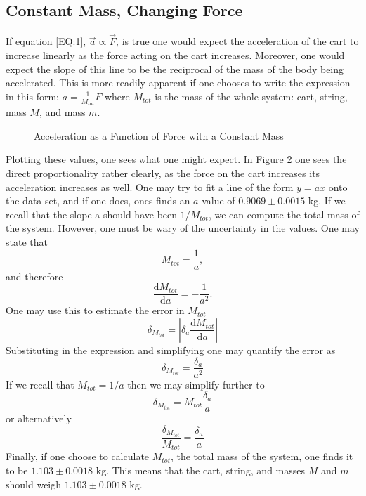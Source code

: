 \documentclass[11pt]{article}
\begin{document}
\subsection{Constant Mass, Changing Force}
If equation \eqref{EQ:1}, \( \vec{a} \propto  \vec{F} \), is true one would expect the acceleration of the cart to increase linearly as the force acting on the cart increases. Moreover, one would expect the slope of this line to be the reciprocal of the mass of the body being accelerated. This is more readily apparent if one chooses to write the expression in this form: \( a = \frac{1}{M_{tot}}F\) where \(M_{tot}\) is the mass of the whole system: cart, string, mass \(M\), and mass \(m\). 
\begin{figure}[h]
	\centering
	\caption{Acceleration as a Function of Force with a Constant Mass}
	\label{FIG:1}
\end{figure}
Plotting these values, one sees what one might expect. In Figure 2 one sees the direct proportionality rather clearly, as the force on the cart increases its acceleration increases as well. One may try to fit a line of the form \( y = ax\) onto the data set, and if one does, ones finds an \(a\) value of  \( 0.9069 \pm 0.0015\) kg. If we recall that the slope a should have been \(1 / M_{tot}\), we can compute the total mass of the system. However, one must be wary of the uncertainty in the values. One may state that 
\begin{equation}
M_{tot} = \frac{1}{a},
\end{equation}
and therefore
\begin{equation}
\frac{\mathrm{d}M_{tot}}{\mathrm{d}a} = -\frac{1}{a^2}.
\end{equation}
One may use this to estimate the error in \(M_{tot}\)
\begin{equation}
\delta_{M_{tot}} = \left| \delta_a \frac{\mathrm{d}M_{tot}}{\mathrm{d}a} \right|
\end{equation}
Substituting in the expression and simplifying one may quantify the error as
\begin{equation}
\delta_{M_{tot}} =  \frac{\delta_a}{a^2}
\end{equation}
If we recall that \(M_{tot} = 1 / a\) then we may simplify further to
\begin{equation}
\delta_{M_{tot}} =  M_{tot} \frac{\delta_a}{a}
\end{equation}
or alternatively
\begin{equation}
\frac{\delta_{M_{tot}}}{M_{tot}} =  \frac{\delta_a}{a}
\end{equation}
Finally, if one choose to calculate \(M_{tot}\), the total mass of the system, one finds it to be \(1.103  \pm 0.0018\) kg. This means that the cart, string, and masses \(M\) and \(m\) should weigh \(1.103  \pm 0.0018\) kg.
\end{document}
